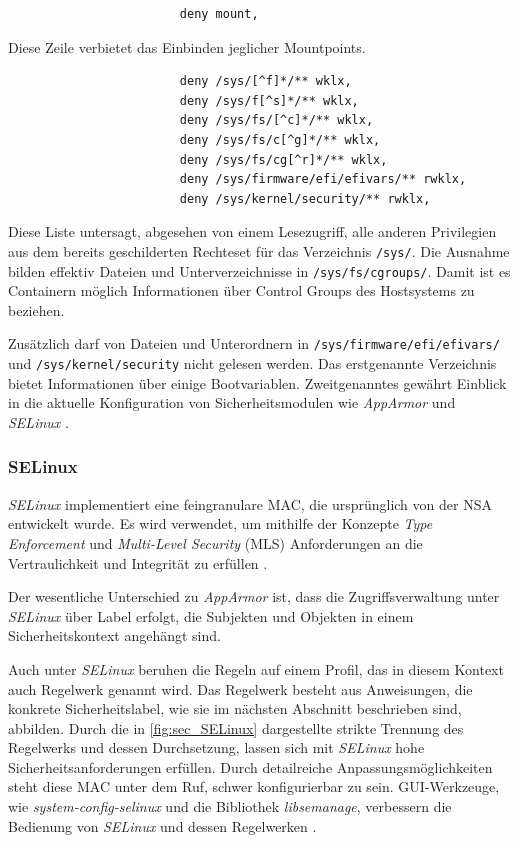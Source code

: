 \documentclass[../main.tex]{subfiles}
\begin{document}
					\begin{lstlisting}
						deny mount,
					\end{lstlisting}
					Diese Zeile verbietet das Einbinden jeglicher Mountpoints.

					\begin{lstlisting}
						deny /sys/[^f]*/** wklx,
						deny /sys/f[^s]*/** wklx,
						deny /sys/fs/[^c]*/** wklx,
						deny /sys/fs/c[^g]*/** wklx,
						deny /sys/fs/cg[^r]*/** wklx,
						deny /sys/firmware/efi/efivars/** rwklx,
						deny /sys/kernel/security/** rwklx,
					\end{lstlisting}
					Diese Liste untersagt, abgesehen von einem Lesezugriff, alle anderen Privilegien aus dem bereits geschilderten Rechteset für das Verzeichnis \texttt{/sys/}. Die Ausnahme bilden effektiv Dateien und Unterverzeichnisse in \texttt{/sys/fs/cgroups/}. Damit ist es Containern möglich Informationen über Control Groups des Hostsystems zu beziehen.

					Zusätzlich darf von Dateien und Unterordnern in \texttt{/sys/firmware/efi/efivars/} und \texttt{/sys/kernel/security} nicht gelesen werden. Das erstgenannte Verzeichnis bietet Informationen über einige Bootvariablen. Zweitgenanntes gewährt Einblick in die aktuelle Konfiguration von Sicherheitsmodulen wie \emph{AppArmor} und \emph{SELinux} \cite{apparmorEFI}\cite{apparmorSecurityFS}\cite{apparmorLWNSecurityFS}.

  		\subsubsection{\acrshort{SELinux}}
			\label{selinux}
				\emph{SELinux} implementiert eine feingranulare MAC, die ursprünglich von der \acrshort{NSA} entwickelt wurde. Es wird verwendet, um mithilfe der Konzepte \emph{Type Enforcement} und \emph{Multi-Level Security} (\acrshort{MLS}) Anforderungen an die Vertraulichkeit und Integrität zu erfüllen \cite{redhatSec}. %

				Der wesentliche Unterschied zu \emph{AppArmor} ist, dass die Zugriffsverwaltung unter \emph{SELinux} über Label erfolgt, die Subjekten und Objekten in einem Sicherheitskontext angehängt sind.


				Auch unter \emph{SELinux} beruhen die Regeln auf einem Profil, das in diesem Kontext auch Regelwerk genannt wird. Das Regelwerk besteht aus Anweisungen, die konkrete Sicherheitslabel, wie sie im nächsten Abschnitt beschrieben sind, abbilden. Durch die in \fig \ref{fig:sec_SELinux} dargestellte strikte Trennung des Regelwerks und dessen Durchsetzung, lassen sich mit \emph{SELinux} hohe Sicherheitsanforderungen erfüllen. Durch detailreiche Anpassungsmöglichkeiten steht diese MAC unter dem Ruf, schwer konfigurierbar zu sein. \acrshort{GUI}-Werkzeuge, wie \emph{system-config-selinux} und die Bibliothek \emph{libsemanage}, verbessern die Bedienung von \emph{SELinux} und dessen Regelwerken \cite[S.62,67]{linuxMagazineSec}.
\end{document}
